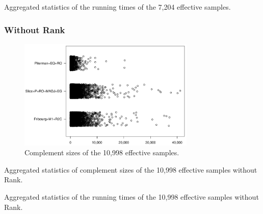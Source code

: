 \begin{table}[ht]
\centering

\caption{Aggregated statistics of the running times of the 7,204 effective samples.}
\end{table}


\subsubsection{Without Rank}


\begin{figure}[ht]
\centering
\includegraphics[width=0.75\textwidth]{figures/r/external/goal/s.stripchart.pdf}
\caption{Complement sizes of the 10,998  effective samples.}
\end{figure}


\begin{table}[ht]
\centering

\caption{Aggregated statistics of complement sizes of the 10,998 effective samples without Rank.}
\end{table}

\begin{table}[ht]
\centering

\caption{Aggregated statistics of the running times of the 10,998 effective samples without Rank.}
\end{table}

\renewcommand{\perspwidth}{0.3}

